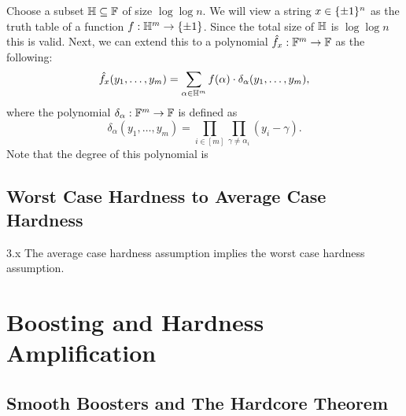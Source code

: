 \documentclass[11pt]{article}
\begin{document}
Choose a subset $\mathbb{H} \subseteq \mathbb{F}$ of size $\log \log n$. We will view a string $x \in \{\pm 1\}^n$ as the truth table of a function $f : \mathbb{H}^{m} \rightarrow \{\pm 1\}$. Since the total size of $\mathbb{H}$ is $\log \log n$ this is valid. Next, we can extend this to a polynomial $\hat{f}_x : \mathbb{F}^m \rightarrow \mathbb{F}$ as the following:
\begin{equation*}
    \hat{f}_x(y_1, \ldots, y_m) = \sum_{\alpha \in \mathbb{H}^m}f(\alpha) \cdot \delta_\alpha(y_1, \ldots, y_m),
\end{equation*} 
where the polynomial $\delta_\alpha : \mathbb{F}^m \rightarrow \mathbb{F}$ is defined as 
\begin{equation*}
    \delta_\alpha(y_1, \ldots, y_m) = \prod_{i \in [m]} \prod_{\gamma \neq \alpha_i} (y_i - \gamma). 
\end{equation*}
Note that the degree of this polynomial is 

\subsection{Worst Case Hardness to Average Case Hardness}

\begin{theorem}{3.x}
    The average case hardness assumption implies the worst case hardness assumption.
\end{theorem}



\section{Boosting and Hardness Amplification}

\subsection{Smooth Boosters and The Hardcore Theorem}
\end{document}
